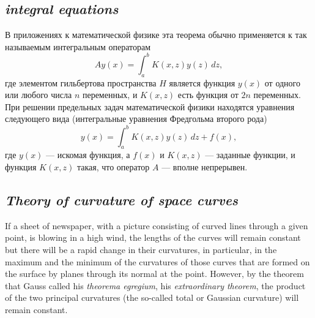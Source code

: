 \subsection*{ \textit{integral equations}}
\begin{rusblock}
В приложениях к математической физике эта теорема обычно применяется к так называемым интегральным операторам
\[
Ay(x)=\int_a^b K(x,z)y(z)\,dz,
\]
где элементом гильбертова пространства $H$ является функция $y(x)$ от одного или любого числа $n$ переменных, и $K(x,z)$ есть функция от $2n$ переменных. При решении предельных задач математической физики находятся уравнения следующего вида (интегральные уравнения Фредгольма второго рода)
\[
y(x)=\int_a^b K(x,z)y(z)\,dz+f(x),
\]
где $y(x)$ --- искомая функция, а $f(x)$ и $K(x,z)$ --- заданные функции, и функция $K(x,z)$ такая, что оператор $A$ --- вполне непрерывен.
\end{rusblock}


\subsection*{ \textit{Theory of curvature of space curves}}
\begin{sourcebox}
If a sheet of newspaper, with a picture consisting of curved lines through a given point, is blowing in a high wind, the lengths of the curves will remain constant but there will be a rapid change in their curvatures, in particular, in the maximum and the minimum of the curvatures of those curves that are formed on the surface by planes through its normal at the point. However, by the theorem that Gauss called his \emph{theorema egregium}, his \emph{extraordinary theorem}, the product of the two principal curvatures (the so-called total or Gaussian curvature) will remain constant.
\end{sourcebox}

